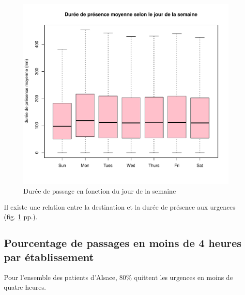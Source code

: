 \documentclass[12pt,english,french,twoside]{book}\usepackage[]{graphicx}\usepackage[]{color}
\makeatletter
\def\maxwidth{ %
  \ifdim\Gin@nat@width>\linewidth
    \linewidth
  \else
    \Gin@nat@width
  \fi
}
\newenvironment{knitrout}{}{} %
\makeatother
\begin{document}
\begin{figure}[ht!]
 \centering
\begin{knitrout}
\color{fgcolor}
\includegraphics[width=\maxwidth]{figure/bp_jour_presence} 

\end{knitrout}

 \caption{Durée de passage en fonction du jour de la semaine}
 \label{duree_jour}
\end{figure}
Il existe une relation entre la destination et la durée de présence aux urgences (fig. \ref{duree_jour} pp.\pageref{duree_jour}).


\subsection{Pourcentage de passages en moins de 4 heures par établissement}




Pour l'ensemble des patients d'Alsace, 80\% quittent les urgences en moins de quatre heures.

\end{document}

